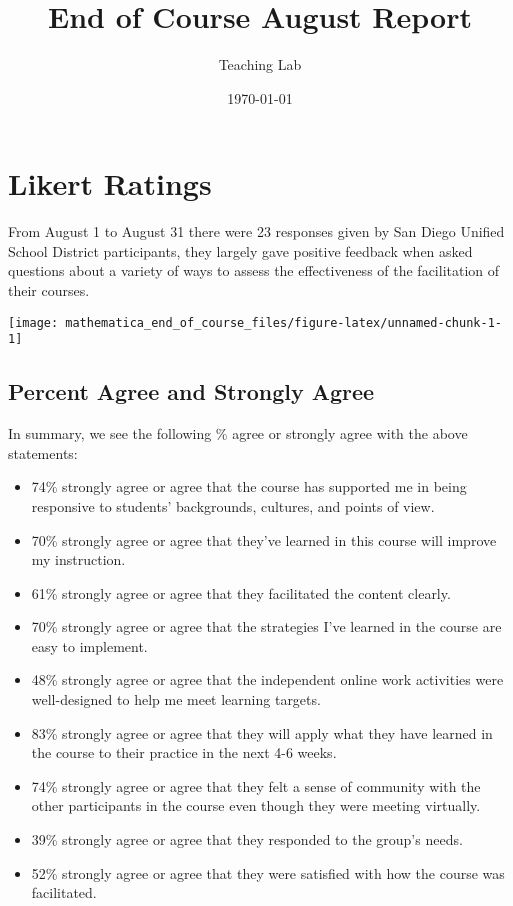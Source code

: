 \documentclass[10,a4paperpaper,]{article}
\title{End of Course August Report}
\author{Teaching Lab}
\date{\today}
\begin{document}
\renewcommand{\contentsname}{Table of Contents}

\renewcommand{\pagename}{Page}


\maketitle
\tableofcontents
{}
\clearpage

\section{Likert Ratings}

From August 1 to August 31 there were 23 responses given by San Diego
Unified School District participants, they largely gave positive
feedback when asked questions about a variety of ways to assess the
effectiveness of the facilitation of their courses.

\begin{center}\texttt{[image: mathematica\_end\_of\_course\_files/figure-latex/unnamed-chunk-1-1]} \end{center}

\subsection{Percent Agree and Strongly Agree}

In summary, we see the following \% agree or strongly agree with the
above statements:

\begin{itemize}
\tightlist
\item
  74\% strongly agree or agree that the course has supported me in being
  responsive to students' backgrounds, cultures, and points of view.
\item
  70\% strongly agree or agree that they've learned in this course will
  improve my instruction.
\item
  61\% strongly agree or agree that they facilitated the content
  clearly.
\item
  70\% strongly agree or agree that the strategies I've learned in the
  course are easy to implement.
\item
  48\% strongly agree or agree that the independent online work
  activities were well-designed to help me meet learning targets.
\item
  83\% strongly agree or agree that they will apply what they have
  learned in the course to their practice in the next 4-6 weeks.
\item
  74\% strongly agree or agree that they felt a sense of community with
  the other participants in the course even though they were meeting
  virtually.
\item
  39\% strongly agree or agree that they responded to the group's needs.
\item
  52\% strongly agree or agree that they were satisfied with how the
  course was facilitated.
\end{itemize}
\end{document}
